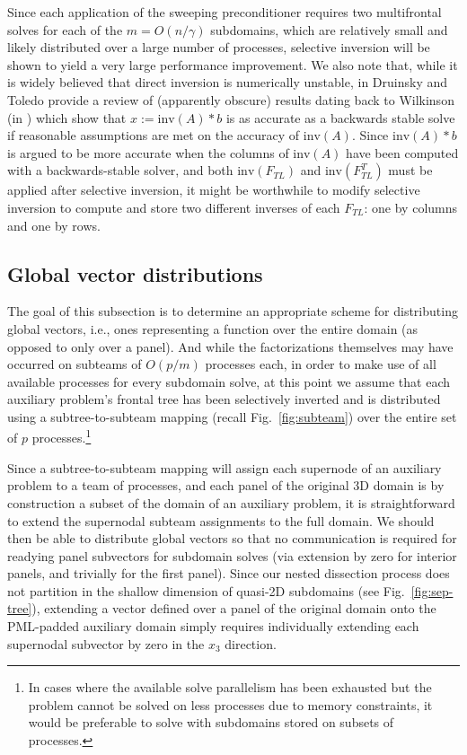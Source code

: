 Since each application of the sweeping preconditioner requires two multifrontal
solves for each of the $m=O(n/\gamma)$ subdomains, which are relatively small 
and likely distributed over a large number of processes, selective inversion 
will be shown to yield a very large performance improvement.
We also note that, while it is widely believed that direct inversion is 
numerically unstable, in \cite{DruinskyToledo-inverse} Druinsky and Toledo 
provide a review of (apparently obscure) results dating back to Wilkinson 
(in \cite{Wilkinson-rounding}) which show that $x := \mathrm{inv}(A)\!*\!b$ is
as accurate as a backwards stable solve if reasonable assumptions are met
on the accuracy of $\mathrm{inv}(A)$. Since $\mathrm{inv}(A)\!*\!b$ is argued to
be more accurate when the columns of $\mathrm{inv}(A)$ have been computed 
with a backwards-stable solver, and both $\mathrm{inv}(F_{TL})$ and 
$\mathrm{inv}(F_{TL}^T)$ must be applied after selective inversion, it might
be worthwhile to modify selective inversion to compute and store two different 
inverses of each $F_{TL}$: one by columns and one by rows. 

\subsection{Global vector distributions}
The goal of this subsection is to determine an appropriate scheme for
distributing global vectors, i.e., ones representing a function over the 
entire domain (as opposed to only over a panel). And while the
factorizations themselves may have occurred on subteams of $O(p/m)$ processes 
each, in order to make use of all available processes for every subdomain solve,
at this point we assume that each auxiliary problem's frontal tree has 
been selectively inverted and is distributed using a subtree-to-subteam mapping 
(recall Fig.~\ref{fig:subteam}) over the entire set of $p$ 
processes.\footnote{In cases where the available solve parallelism has been 
exhausted but the problem cannot be solved on less processes due to memory 
constraints, it would be preferable to solve with subdomains stored on subsets 
of processes.}

Since a subtree-to-subteam mapping will assign each supernode of an 
auxiliary problem to a team of processes, and each panel of the original
3D domain is by construction a subset of the domain of an auxiliary 
problem, it is straightforward to extend the supernodal subteam assignments to 
the full domain. We should then be able to distribute global vectors so
that no communication is required for readying panel subvectors for 
subdomain solves (via extension by zero for interior panels, and trivially for 
the first panel). Since our nested dissection process does not partition in 
the shallow dimension of quasi-2D subdomains (see Fig.~\ref{fig:sep-tree}), 
extending a vector defined over a panel of the original domain onto the 
PML-padded auxiliary domain simply requires individually extending each 
supernodal subvector by zero in the $x_3$ direction.

